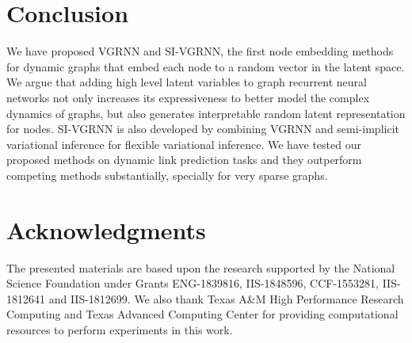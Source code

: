 \documentclass{article}
\begin{document}
\section{Conclusion}
We have proposed VGRNN and SI-VGRNN, the first node embedding methods for dynamic graphs that embed each node to a random vector in the latent space. We argue that adding high level latent variables to graph recurrent neural networks not only increases its expressiveness to better model the complex dynamics of graphs, but also generates interpretable random latent representation for nodes. SI-VGRNN is also developed by combining VGRNN and semi-implicit variational inference for flexible variational inference. We have tested our proposed methods on dynamic link prediction tasks and they outperform competing methods substantially, specially for very sparse graphs.

\section{Acknowledgments}
{The presented materials are based upon the research supported by the National Science Foundation under Grants ENG-1839816, IIS-1848596, CCF-1553281, IIS-1812641 and IIS-1812699. We also thank Texas A\&M High Performance Research Computing and Texas Advanced Computing Center for providing computational resources to perform experiments in this work.}



\end{document}
